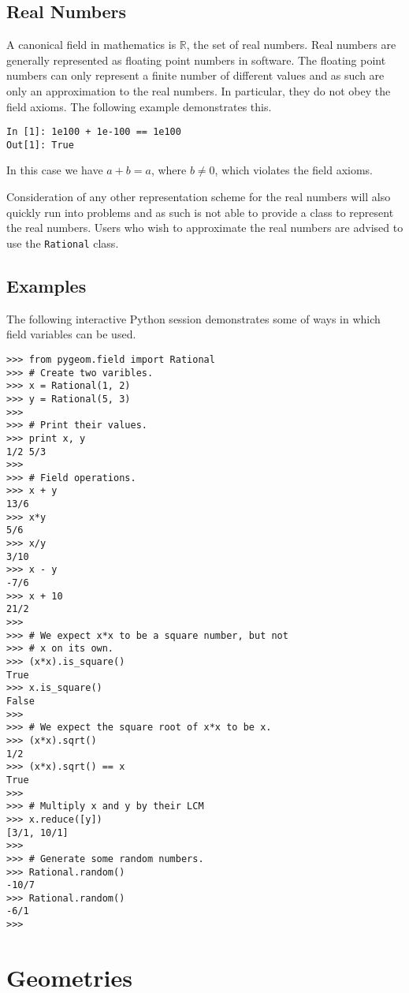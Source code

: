 \subsection{Real Numbers}

A canonical field in mathematics is $\mathbb{R}$, the set of real numbers.
Real numbers are generally represented as floating point numbers in software.
The floating point numbers can only represent a finite number of different values and as such are only an approximation to the real numbers.
In particular, they do not obey the field axioms.
The following example demonstrates this.
\begin{verbatim}
In [1]: 1e100 + 1e-100 == 1e100
Out[1]: True
\end{verbatim}
In this case we have $a + b = a$, where $b \neq 0$, which violates the field axioms.

Consideration of any other representation scheme for the real numbers will also quickly run into problems and as such \pygeom is not able to provide a class to represent the real numbers.
Users who wish to approximate the real numbers are advised to use the \texttt{Rational} class.

\subsection{Examples}

The following interactive Python session demonstrates some of ways in which \pygeom field variables can be used.

\begin{verbatim}
>>> from pygeom.field import Rational
>>> # Create two varibles.
>>> x = Rational(1, 2)
>>> y = Rational(5, 3)
>>> 
>>> # Print their values.
>>> print x, y
1/2 5/3
>>> 
>>> # Field operations.
>>> x + y
13/6
>>> x*y
5/6
>>> x/y
3/10
>>> x - y
-7/6
>>> x + 10
21/2
>>> 
>>> # We expect x*x to be a square number, but not
>>> # x on its own.
>>> (x*x).is_square()
True
>>> x.is_square()
False
>>> 
>>> # We expect the square root of x*x to be x.
>>> (x*x).sqrt()
1/2
>>> (x*x).sqrt() == x
True
>>> 
>>> # Multiply x and y by their LCM
>>> x.reduce([y])
[3/1, 10/1]
>>> 
>>> # Generate some random numbers.
>>> Rational.random()
-10/7
>>> Rational.random()
-6/1
>>> 
\end{verbatim}

\section{Geometries}

